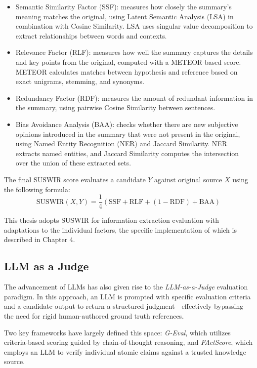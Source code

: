 \begin{itemize}
    \item Semantic Similarity Factor (SSF): measures how closely the summary's meaning matches the original, using Latent Semantic Analysis (LSA) in combination with Cosine Similarity. LSA uses singular value decomposition to extract relationships between words and contexts.
    \item Relevance Factor (RLF): measures how well the summary captures the details and key points from the original, computed with a METEOR-based score. METEOR calculates matches between hypothesis and reference based on exact unigrams, stemming, and synonyms. 
    \item Redundancy Factor (RDF): measures the amount of redundant information in the summary, using pairwise Cosine Similarity between sentences.
    \item Bias Avoidance Analysis (BAA): checks whether there are new subjective opinions introduced in the summary that were not present in the original, using Named Entity Recognition (NER) and Jaccard Similarity. NER extracts named entities, and Jaccard Similarity computes the intersection over the union of these extracted sets.
\end{itemize}

The final SUSWIR score evaluates a candidate $Y$ against original source $X$ using the following formula:
\[ \text{SUSWIR}(X, Y) = \frac{1}{4} \left( \text{SSF} + \text{RLF} + (1 - \text{RDF}) + \text{BAA} \right) \]

This thesis adopts SUSWIR for information extraction evaluation with adaptations to the individual factors, the specific implementation of which is described in Chapter 4.

\subsection{LLM as a Judge}

The advancement of LLMs has also given rise to the \textit{LLM-as-a-Judge} evaluation paradigm.
In this approach, an LLM is prompted with specific evaluation criteria and a candidate output to return a structured judgment—effectively bypassing the need for rigid human-authored ground truth references. 

Two key frameworks have largely defined this space: \textit{G-Eval}\cite{liuGEvalNLGEvaluation2023}, which utilizes criteria-based scoring guided by chain-of-thought reasoning, and \textit{FActScore}\cite{minFActScoreFinegrainedAtomic2023}, which employs an LLM to verify individual atomic claims against a trusted knowledge source. 

